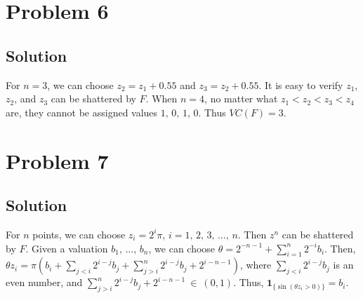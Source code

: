 \documentclass[11pt]{report}
\DeclarePairedDelimiter\floor{\lfloor}{\rfloor}
\begin{document}
\section*{Problem 6}
\subsection*{Solution}
For $n = 3$, we can choose $z_2 = z_1 + 0.55$ and $z_3 = z_2 + 0.55$. It is easy to verify $z_1$, $z_2$, and $z_3$ can be shattered by $F$. When $n = 4$, no matter what $z_1 < z_2 < z_3 < z_4$ are, they cannot be assigned values $1,\,0,\,1,\,0$. Thus $VC(F) = 3$.
\section*{Problem 7}
\subsection*{Solution}
For $n$ points, we can choose $z_i = 2^i \pi$, $i=1,\,2,\,3,\,\dots,\,n$. Then $z^n$ can be shattered by $F$. Given a valuation $b_1,\,\dots,\,b_n$, we can choose $\theta = 2^{-n-1} + \sum_{i=1}^{n} 2^{-i} b_i$. Then, $\theta z_i = \pi (b_i + \sum_{j<i} 2^{i-j} b_j + \sum_{j>i}^{n} 2^{i-j} b_j + 2^{i-n-1})$, where $\sum_{j<i} 2^{i-j} b_j$ is an even number, and $\sum_{j>i}^{n} 2^{i-j} b_j + 2^{i-n-1}~\in~(0, 1)$. Thus, $\bm 1_{\{\sin(\theta z_i > 0)\}} = b_i$.
\end{document}

